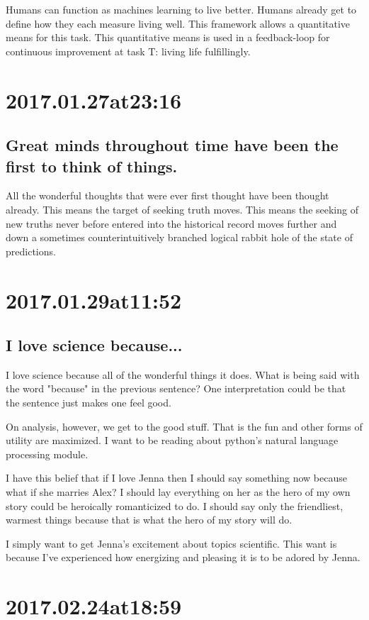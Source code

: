 Humans can function as machines learning to live better.
Humans already get to define how they each measure living well.
This framework allows a quantitative means for this task.
This quantitative means is used in a feedback-loop for continuous improvement at task T: living life fulfillingly.

\section*{ 2017.01.27at23:16 }
\subsection*{ Great minds throughout time have been the first to think of things. }
All the wonderful thoughts that were ever first thought have been thought already.
This means the target of seeking truth moves.
This means the seeking of new truths never before entered into the historical record moves further and down a sometimes counterintuitively branched logical rabbit hole of the state of predictions.

\section*{ 2017.01.29at11:52 }
\subsection*{ I love science because... }
I love science because all of the wonderful things it does.
What is being said with the word "because" in the previous sentence?
One interpretation could be that the sentence just makes one feel good.

On analysis, however, we get to the good stuff.
That is the fun and other forms of utility are maximized.
I want to be reading about python's natural language processing module.

I have this belief that if I love Jenna then I should say something now because what if she marries Alex?
I should lay everything on her as the hero of my own story could be heroically romanticized to do.
I should say only the friendliest, warmest things because that is what the hero of my story will do.

I simply want to get Jenna's excitement about topics scientific.
This want is because I've experienced how energizing and pleasing it is to be adored by Jenna. 

\section*{ 2017.02.24at18:59 }
